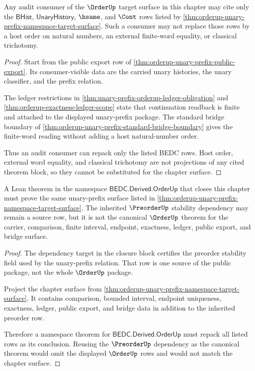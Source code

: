 \begin{theorem}
\label{thm:orderup-unary-prefix-audit-consumer-boundary}
Any audit consumer of the $\OrderUp$ target surface in this chapter may cite only the $\mathsf{BHist}$, $\mathsf{UnaryHistory}$, $\hsame$, and $\Cont$ rows listed by \autoref{thm:orderup-unary-prefix-namespace-target-surface}. Such a consumer may not replace those rows by a host order on natural numbers, an external finite-word equality, or classical trichotomy.
\end{theorem}
\begin{proof}
Start from the public export row of \autoref{thm:orderup-unary-prefix-public-export}. Its consumer-visible data are the carried unary histories, the unary classifier, and the prefix relation.

The ledger restrictions in \autoref{thm:unary-prefix-orderup-ledger-obligation} and \autoref{thm:orderup-exactness-ledger-scope} state that continuation readback is finite and attached to the displayed unary-prefix package. The standard bridge boundary of \autoref{thm:orderup-unary-prefix-standard-bridge-boundary} gives the finite-word reading without adding a host natural-number order.

Thus an audit consumer can repack only the listed BEDC rows. Host order, external word equality, and classical trichotomy are not projections of any cited theorem block, so they cannot be substituted for the chapter surface.
\end{proof}

\begin{theorem}
\label{thm:orderup-unary-prefix-formalization-handshake}
A Lean theorem in the namespace $\mathsf{BEDC.Derived.OrderUp}$ that closes this chapter must prove the same unary-prefix surface listed in \autoref{thm:orderup-unary-prefix-namespace-target-surface}. The inherited $\PreorderUp$ stability dependency may remain a source row, but it is not the canonical $\OrderUp$ theorem for the carrier, comparison, finite interval, endpoint, exactness, ledger, public export, and bridge surface.
\end{theorem}
\begin{proof}
The dependency target in the closure block certifies the preorder stability field used by the unary-prefix relation. That row is one source of the public package, not the whole $\OrderUp$ package.

Project the chapter surface from \autoref{thm:orderup-unary-prefix-namespace-target-surface}. It contains comparison, bounded interval, endpoint uniqueness, exactness, ledger, public export, and bridge data in addition to the inherited preorder row.

Therefore a namespace theorem for $\mathsf{BEDC.Derived.OrderUp}$ must repack all listed rows as its conclusion. Reusing the $\PreorderUp$ dependency as the canonical theorem would omit the displayed $\OrderUp$ rows and would not match the chapter surface.
\end{proof}

